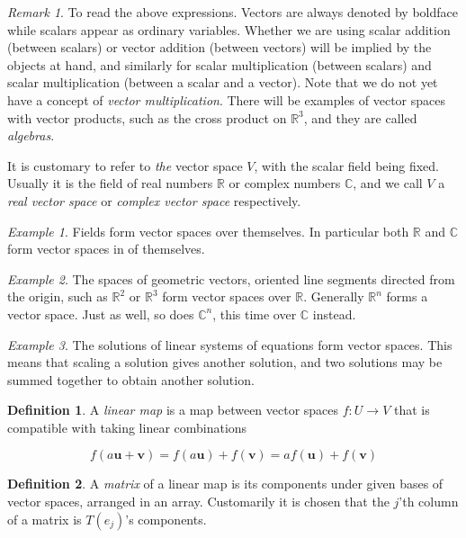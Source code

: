 \documentclass[12pt]{article}
\theoremstyle{definition}
\newtheorem{definition}{Definition}[section]
\theoremstyle{remark}
\newtheorem*{remark}{Remark}
\theoremstyle{example}
\newtheorem{example}{Example}
\theoremstyle{theorem}
\theoremstyle{lemma}
\def\b#1{\textbf{#1}}
\begin{document}
\begin{remark}
	To read the above expressions. Vectors are always denoted by boldface while scalars appear as ordinary variables. Whether we are using scalar addition (between scalars) or vector addition (between vectors) will be implied by the objects at hand, and similarly for scalar multiplication (between scalars) and scalar multiplication (between a scalar and a vector). Note that we do not yet have a concept of \textit{vector multiplication}. There will be examples of vector spaces with vector products, such as the cross product on $\mathbb{R}^3$, and they are called \textit{algebras}.
	
	It is customary to refer to \textit{the} vector space $V$, with the scalar field being fixed. Usually it is the field of real numbers $\mathbb{R}$ or complex numbers $\mathbb{C}$, and we call $V$ a \textit{real vector space} or \textit{complex vector space} respectively.
\end{remark}

\begin{example}
	Fields form vector spaces over themselves. In particular both $\mathbb{R}$ and $\mathbb{C}$ form vector spaces in of themselves.
\end{example}

\begin{example}
	The spaces of geometric vectors, oriented line segments directed from the origin, such as $\mathbb{R}^2$ or $\mathbb{R}^3$ form vector spaces over $\mathbb{R}$. Generally $\mathbb{R}^n$ forms a vector space. Just as well, so does $\mathbb{C}^n$, this time over $\mathbb{C}$ instead.
\end{example}

\begin{example}
	The solutions of linear systems of equations form vector spaces. This means that scaling a solution gives another solution, and two solutions may be summed together to obtain another solution.
\end{example}

\begin{definition}
	A \textit{linear map} is a map between vector spaces $f:U\to V$ that is compatible with taking linear combinations
	
	\begin{equation}
		f(a\b{u}+\b{v}) = f(a\b{u})+f(\b{v})=af(\b{u})+f(\b{v})
	\end{equation}
\end{definition}

\begin{definition}
	A \textit{matrix} of a linear map is its components under given bases of vector spaces, arranged in an array. Customarily it is chosen that the $j$'th column of a matrix is $T(e_j)$'s components.
\end{definition}
\end{document}
